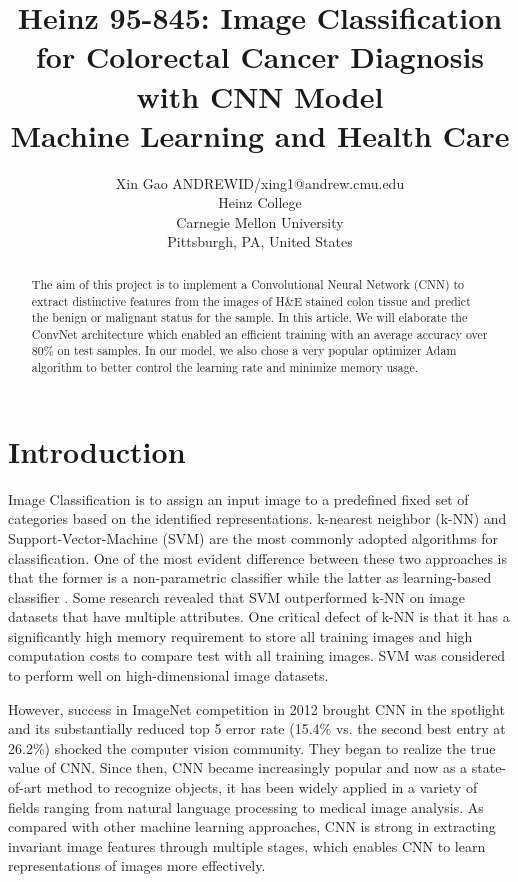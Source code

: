\documentclass[twoside,11pt]{article}
\begin{document}
\title{Heinz 95-845: Image Classification for Colorectal Cancer Diagnosis with CNN Model \\Machine Learning and Health Care}

\author{\name Xin Gao \email ANDREWID/xing1@andrew.cmu.edu \\
       \addr Heinz College\\
       Carnegie Mellon University\\
       Pittsburgh, PA, United States} 

\maketitle

\begin{abstract}

The aim of this project is to implement a Convolutional Neural Network (CNN) to extract distinctive features from the images of H&E stained colon tissue and predict the benign or malignant status for the sample. In this article, We will elaborate the ConvNet architecture which enabled an efficient training with an average accuracy over 80\% on test samples. In our model, we also chose a very popular optimizer Adam algorithm to better control the learning rate and minimize memory usage. 
 
\end{abstract}

\section{Introduction}
Image Classification is to assign an input image to a predefined fixed set of categories based on the identified representations. k-nearest neighbor (k-NN) and Support-Vector-Machine (SVM) are the most commonly adopted algorithms for classification. One of the most evident difference between these two approaches is that the former is a non-parametric classifier while the latter as learning-based classifier \citep{1}. Some research \citep{2}revealed that SVM outperformed k-NN on image datasets that have multiple attributes. One critical defect of k-NN is that it has a significantly high memory requirement to store all training images and high computation costs to compare test with all training images. SVM was considered to perform well on high-dimensional image datasets.

However, success in ImageNet competition in 2012 brought CNN in the spotlight and its substantially reduced top 5 error rate (15.4\% vs. the second best entry at 26.2\%) \citep{3}shocked the computer vision community. They began to realize the true value of CNN. Since then, CNN became increasingly popular and now as a state-of-art method to recognize objects, it has been widely applied in a variety of fields ranging from natural language processing to medical image analysis. As compared with other machine learning approaches, CNN is strong in extracting invariant image features through multiple stages, which enables CNN to learn representations of images more effectively.  
\end{document}
